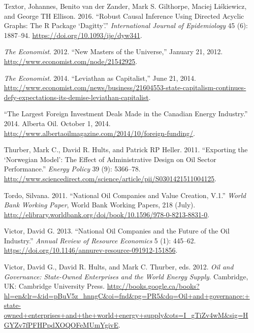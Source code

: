 \documentclass[11pt,]{book}
\begin{document}
\leavevmode\hypertarget{ref-textor_robust_2016}{}%
Textor, Johannes, Benito van der Zander, Mark S. Gilthorpe, Maciej Liśkiewicz, and George TH Ellison. 2016. ``Robust Causal Inference Using Directed Acyclic Graphs: The R Package `Dagitty'.'' \emph{International Journal of Epidemiology} 45 (6): 1887--94. \url{https://doi.org/10.1093/ije/dyw341}.

\leavevmode\hypertarget{ref-noauthor_new_2012}{}%
\emph{The Economist}. 2012. ``New Masters of the Universe,'' January 21, 2012. \url{http://www.economist.com/node/21542925}.

\leavevmode\hypertarget{ref-noauthor_leviathan_2014}{}%
\emph{The Economist}. 2014. ``Leviathan as Capitalist,'' June 21, 2014. \url{http://www.economist.com/news/business/21604553-state-capitalism-continues-defy-expectations-its-demise-leviathan-capitalist}.

\leavevmode\hypertarget{ref-noauthor_largest_2014}{}%
``The Largest Foreign Investment Deals Made in the Canadian Energy Industry.'' 2014. Alberta Oil. October 1, 2014. \url{http://www.albertaoilmagazine.com/2014/10/foreign-funding/}.

\leavevmode\hypertarget{ref-thurber_exporting_2011}{}%
Thurber, Mark C., David R. Hults, and Patrick RP Heller. 2011. ``Exporting the `Norwegian Model': The Effect of Administrative Design on Oil Sector Performance.'' \emph{Energy Policy} 39 (9): 5366--78. \url{http://www.sciencedirect.com/science/article/pii/S0301421511004125}.

\leavevmode\hypertarget{ref-tordo_national_2011}{}%
Tordo, Silvana. 2011. ``National Oil Companies and Value Creation, V.1.'' \emph{World Bank Working Paper}, World Bank Working Papers, 218 (July). \url{http://elibrary.worldbank.org/doi/book/10.1596/978-0-8213-8831-0}.

\leavevmode\hypertarget{ref-victor_national_2013}{}%
Victor, David G. 2013. ``National Oil Companies and the Future of the Oil Industry.'' \emph{Annual Review of Resource Economics} 5 (1): 445--62. \url{https://doi.org/10.1146/annurev-resource-091912-151856}.

\leavevmode\hypertarget{ref-victor_oil_2012}{}%
Victor, David G., David R. Hults, and Mark C. Thurber, eds. 2012. \emph{Oil and Governance: State-Owned Enterprises and the World Energy Supply}. Cambridge, UK: Cambridge University Press. \url{http://books.google.ca/books?hl=en\&lr=\&id=pBuV5z_hnngC\&oi=fnd\&pg=PR5\&dq=Oil+and+governance:+state-owned+enterprises+and+the+world+energy+supply\&ots=I_gTiZv4wM\&sig=HGYZv7fPFHPpdXOQOFeMUmYgivE}.
\end{document}
